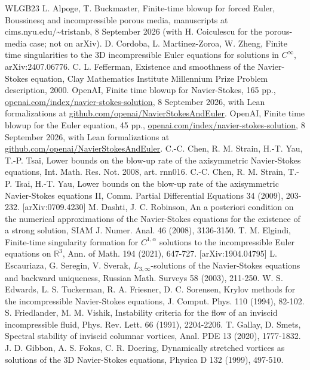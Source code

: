 \documentclass[11pt]{article}
\begin{document}
\begin{thebibliography}{WLGB23}
 L. Alpoge, T. Buckmaster, Finite-time blowup for forced Euler, Boussinesq and incompressible porous media, manuscripts at cims.nyu.edu/\~{}tristanb, 8 September 2026 (with H. Coiculescu for the porous-media case; not on arXiv).
 D. Cordoba, L. Martinez-Zoroa, W. Zheng, Finite time singularities to the 3D incompressible Euler equations for solutions in $C^\infty$, arXiv:2407.06776.
 C. L. Fefferman, Existence and smoothness of the Navier-Stokes equation, Clay Mathematics Institute Millennium Prize Problem description, 2000.
 OpenAI, Finite time blowup for Navier-Stokes, 165 pp., \url{openai.com/index/navier-stokes-solution}, 8 September 2026, with Lean formalizations at \url{github.com/openai/NavierStokesAndEuler}.
 OpenAI, Finite time blowup for the Euler equation, 45 pp., \url{openai.com/index/navier-stokes-solution}, 8 September 2026, with Lean formalizations at \url{github.com/openai/NavierStokesAndEuler}.
 C.-C. Chen, R. M. Strain, H.-T. Yau, T.-P. Tsai, Lower bounds on the blow-up rate of the axisymmetric Navier-Stokes equations, Int. Math. Res. Not. 2008, art. rnn016.
 C.-C. Chen, R. M. Strain, T.-P. Tsai, H.-T. Yau, Lower bounds on the blow-up rate of the axisymmetric Navier-Stokes equations II, Comm. Partial Differential Equations 34 (2009), 203-232. [arXiv:0709.4230]
 M. Dashti, J. C. Robinson, An a posteriori condition on the numerical approximations of the Navier-Stokes equations for the existence of a strong solution, SIAM J. Numer. Anal. 46 (2008), 3136-3150.
 T. M. Elgindi, Finite-time singularity formation for $C^{1,\alpha}$ solutions to the incompressible Euler equations on $\mathbb{R}^3$, Ann. of Math. 194 (2021), 647-727. [arXiv:1904.04795]
 L. Escauriaza, G. Seregin, V. Sverak, $L_{3,\infty}$-solutions of the Navier-Stokes equations and backward uniqueness, Russian Math. Surveys 58 (2003), 211-250.
 W. S. Edwards, L. S. Tuckerman, R. A. Friesner, D. C. Sorensen, Krylov methods for the incompressible Navier-Stokes equations, J. Comput. Phys. 110 (1994), 82-102.
 S. Friedlander, M. M. Vishik, Instability criteria for the flow of an inviscid incompressible fluid, Phys. Rev. Lett. 66 (1991), 2204-2206.
 T. Gallay, D. Smets, Spectral stability of inviscid columnar vortices, Anal. PDE 13 (2020), 1777-1832.
 J. D. Gibbon, A. S. Fokas, C. R. Doering, Dynamically stretched vortices as solutions of the 3D Navier-Stokes equations, Physica D 132 (1999), 497-510.

\end{thebibliography}
\end{document}
